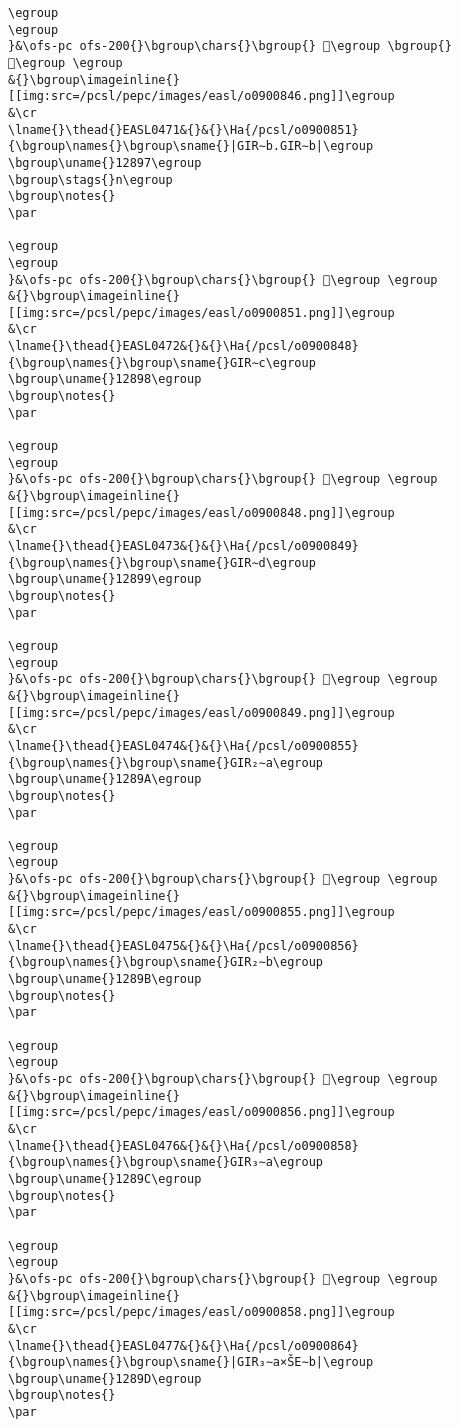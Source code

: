 \begin{verbatim}
\egroup
\egroup
}&\ofs-pc ofs-200{}\bgroup\chars{}\bgroup{} 𒢕\egroup \bgroup{} 𒢖\egroup \egroup
&{}\bgroup\imageinline{}[[img:src=/pcsl/pepc/images/easl/o0900846.png]]\egroup
&\cr
\lname{}\thead{}EASL0471&{}&{}\Ha{/pcsl/o0900851}{\bgroup\names{}\bgroup\sname{}|GIR∼b.GIR∼b|\egroup
\bgroup\uname{}12897\egroup
\bgroup\stags{}n\egroup
\bgroup\notes{}
\par 

\egroup
\egroup
}&\ofs-pc ofs-200{}\bgroup\chars{}\bgroup{} 𒢗\egroup \egroup
&{}\bgroup\imageinline{}[[img:src=/pcsl/pepc/images/easl/o0900851.png]]\egroup
&\cr
\lname{}\thead{}EASL0472&{}&{}\Ha{/pcsl/o0900848}{\bgroup\names{}\bgroup\sname{}GIR∼c\egroup
\bgroup\uname{}12898\egroup
\bgroup\notes{}
\par 

\egroup
\egroup
}&\ofs-pc ofs-200{}\bgroup\chars{}\bgroup{} 𒢘\egroup \egroup
&{}\bgroup\imageinline{}[[img:src=/pcsl/pepc/images/easl/o0900848.png]]\egroup
&\cr
\lname{}\thead{}EASL0473&{}&{}\Ha{/pcsl/o0900849}{\bgroup\names{}\bgroup\sname{}GIR∼d\egroup
\bgroup\uname{}12899\egroup
\bgroup\notes{}
\par 

\egroup
\egroup
}&\ofs-pc ofs-200{}\bgroup\chars{}\bgroup{} 𒢙\egroup \egroup
&{}\bgroup\imageinline{}[[img:src=/pcsl/pepc/images/easl/o0900849.png]]\egroup
&\cr
\lname{}\thead{}EASL0474&{}&{}\Ha{/pcsl/o0900855}{\bgroup\names{}\bgroup\sname{}GIR₂∼a\egroup
\bgroup\uname{}1289A\egroup
\bgroup\notes{}
\par 

\egroup
\egroup
}&\ofs-pc ofs-200{}\bgroup\chars{}\bgroup{} 𒢚\egroup \egroup
&{}\bgroup\imageinline{}[[img:src=/pcsl/pepc/images/easl/o0900855.png]]\egroup
&\cr
\lname{}\thead{}EASL0475&{}&{}\Ha{/pcsl/o0900856}{\bgroup\names{}\bgroup\sname{}GIR₂∼b\egroup
\bgroup\uname{}1289B\egroup
\bgroup\notes{}
\par 

\egroup
\egroup
}&\ofs-pc ofs-200{}\bgroup\chars{}\bgroup{} 𒢛\egroup \egroup
&{}\bgroup\imageinline{}[[img:src=/pcsl/pepc/images/easl/o0900856.png]]\egroup
&\cr
\lname{}\thead{}EASL0476&{}&{}\Ha{/pcsl/o0900858}{\bgroup\names{}\bgroup\sname{}GIR₃∼a\egroup
\bgroup\uname{}1289C\egroup
\bgroup\notes{}
\par 

\egroup
\egroup
}&\ofs-pc ofs-200{}\bgroup\chars{}\bgroup{} 𒢜\egroup \egroup
&{}\bgroup\imageinline{}[[img:src=/pcsl/pepc/images/easl/o0900858.png]]\egroup
&\cr
\lname{}\thead{}EASL0477&{}&{}\Ha{/pcsl/o0900864}{\bgroup\names{}\bgroup\sname{}|GIR₃∼a×ŠE∼b|\egroup
\bgroup\uname{}1289D\egroup
\bgroup\notes{}
\par 


\end{verbatim}
